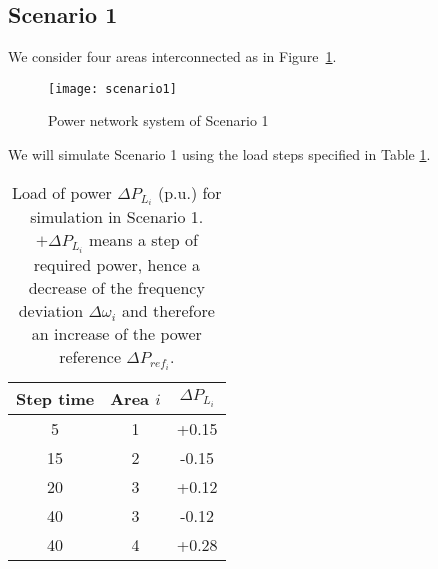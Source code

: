 \documentclass[a4paper]{article}
\begin{document}
          
          \subsection{Scenario 1}
               \label{sec:scenario1}
               We consider four areas interconnected as in Figure~\ref{fig:scenario1}.
               \begin{figure}[!ht]
                 \centering
                 \texttt{[image: scenario1]}
                 \caption{Power network system of Scenario 1}
                 \label{fig:scenario1}
               \end{figure}
               We will simulate Scenario 1 using the load steps specified in Table \ref{tab:simulationscen1}.
               \begin{table}[!ht]
                 \centering
                 \begin{tabular}{|c|c|c|}
                   \hline
                   Step time  &  Area $i$ & $\Delta P_{L_i}$ \\
                   \hline
                   5               &      1        &   +0.15             \\
                   \hline
                   15             &      2        &   -0.15             \\
                   \hline
                   20             &      3        &   +0.12             \\
                   \hline
                   40             &      3        &   -0.12             \\
                   \hline
                   40             &      4        &   +0.28            \\
                   \hline
                 \end{tabular}
                 \caption{Load of power $\Delta P_{L_i}$ (p.u.) for simulation in Scenario 1. $+\Delta P_{L_i}$ means a step of required power, hence a decrease of the frequency deviation $\Delta\omega_i$ and therefore an increase of the power reference $\Delta P_{ref_i}$.}
                 \label{tab:simulationscen1}
               \end{table}
\end{document}
